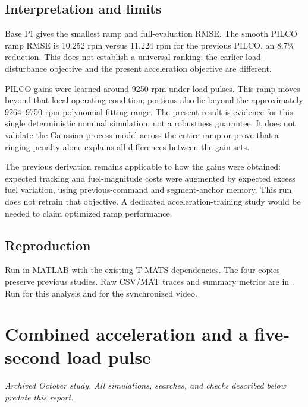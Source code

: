 \subsection{Interpretation and limits}
Base PI gives the smallest ramp and full-evaluation RMSE. The smooth PILCO ramp RMSE is 10.252 rpm versus 11.224 rpm for the previous PILCO, an 8.7\% reduction. This does not establish a universal ranking: the earlier load-disturbance objective and the present acceleration objective are different.

PILCO gains were learned around 9250 rpm under load pulses. This ramp moves beyond that local operating condition; portions also lie beyond the approximately 9264--9750 rpm polynomial fitting range. The present result is evidence for this single deterministic nominal simulation, not a robustness guarantee. It does not validate the Gaussian-process model across the entire ramp or prove that a ringing penalty alone explains all differences between the gain sets.

The previous derivation remains applicable to how the gains were obtained: expected tracking and fuel-magnitude costs were augmented by expected excess fuel variation, using previous-command and segment-anchor memory. This run does not retrain that objective. A dedicated acceleration-training study would be needed to claim optimized ramp performance.
\subsection{Reproduction}
Run  in MATLAB with the existing T-MATS dependencies. The four  copies preserve previous studies. Raw CSV/MAT traces and summary metrics are in . Run  for this analysis and  for the synchronized video.


\section{Combined acceleration and a five-second load pulse}
\textit{Archived October study. All simulations, searches, and checks described below predate this report.}\par

